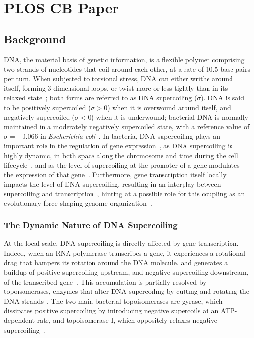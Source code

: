 \chapter{PLOS CB Paper}
\label{chap:ploscb}

\section{Background}

DNA, the material basis of genetic information, is a flexible polymer comprising two strands of nucleotides that coil around each other, at a rate of 10.5 base pairs per turn.
When subjected to torsional stress, DNA can either writhe around itself, forming 3-dimensional loops, or twist more or less tightly than in its relaxed state~\citep{krogh2018}; both forms are referred to as DNA supercoiling ($\sigma$).
DNA is said to be positively supercoiled ($\sigma > 0$) when it is overwound around itself, and negatively supercoiled ($\sigma < 0$) when it is underwound; bacterial DNA is normally maintained in a moderately negatively supercoiled state, with a reference value of $\sigma=-0.066$ in \emph{Escherichia coli}~\citep{crozat2005}.
In bacteria, DNA supercoiling plays an important role in the regulation of gene expression~\citep{martisb.2019}, as DNA supercoiling is highly dynamic, in both space along the chromosome and time during the cell lifecycle~\citep{krogh2018}, and as the level of supercoiling at the promoter of a gene modulates the expression of that gene~\citep{forquet2021}.
Furthermore, gene transcription itself locally impacts the level of DNA supercoiling, resulting in an interplay between supercoiling and transcription~\citep{meyer2014,dorman2019}, hinting at a possible role for this coupling as an evolutionary force shaping genome organization~\citep{junier2016}.

\subsection{The Dynamic Nature of DNA Supercoiling}

At the local scale, DNA supercoiling is directly affected by gene transcription.
Indeed, when an RNA polymerase transcribes a gene, it experiences a rotational drag that hampers its rotation around the DNA molecule, and generates a buildup of positive supercoiling upstream, and negative supercoiling downstream, of the transcribed gene~\citep{liu1987,ma2016}.
This accumulation is partially resolved by topoisomerases, enzymes that alter DNA supercoiling by cutting and rotating the DNA strands~\citep*{duprey2021}.
The two main bacterial topoisomerases are gyrase, which dissipates positive supercoiling by introducing negative supercoils at an ATP-dependent rate, and topoisomerase I, which oppositely relaxes negative supercoiling~\citep{martisb.2019}.

